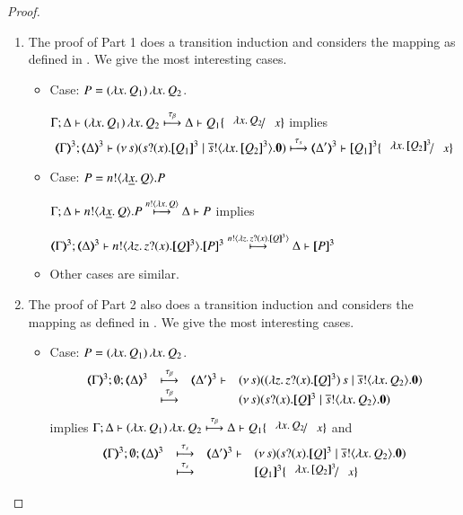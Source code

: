 \begin{proof}
\begin{enumerate}
	\item The proof of Part 1 does a transition induction and
	considers the mapping as defined in .
	We give the most interesting cases.

	\begin{itemize}
		\item	Case: $P = (\lambda x.\,Q_1)\, {\lambda x.\,Q_2}$.

			$\horel{\Gamma}{\Delta}{\appl{(\abs{x}{Q_1})}{\abs{x}{Q_2}}}{\hby{\btau}}{\Delta}{Q_1 \subst{\abs{x}{Q_2}}{x}}$ implies
\[
			\horel{\tmap{\Gamma}{3}}{\tmap{\Delta}{3}}{\newsp{s}{\binp{s}{x} \pmap{Q_1}{3} \Par \bout{\dual{s}}{\abs{x}{\pmap{Q_2}{3}}} \inact}}{\hby{\stau}}
			{\tmap{\Delta'}{3}}{\pmap{Q_1}{3} \subst{\abs{x}{\pmap{Q_2}{3}}}{x}}
\]

		\item	Case: $P = n ! \langle \lambda \underline{x}.\,Q \rangle . P$

			$\Gamma; \Delta \vdash n ! \langle \lambda \underline{x}.\,Q \rangle . P \stackrel{ n ! \langle \lambda x.\,Q \rangle}{\longmapsto} \Delta \vdash P$ implies

			$\horel{\tmap{\Gamma}{3}}{\tmap{\Delta}{3}}{\bout{n}{\abs{z} \binp{z}{x} \pmap{Q}{3}} \pmap{P}{3}}{\hby{ \bactout{n}{\abs{z}{\binp{z}{x} \pmap{Q}{3}} } }}{\Delta}{\pmap{P}{3}}$
		\item Other cases are similar. 
	\end{itemize}

	\item The proof of Part 2 also does a transition induction and
	considers the mapping as defined in .
	We give the most interesting cases.

	\begin{itemize}
		\item	Case: $P = (\lambda x.\,Q_1)\, {\lambda x.\,Q_2}$.
%
		\[
			\mhorel{\tmap{\Gamma}{3}}{\tmap{\Delta}{3}}{\newsp{s}{ \appl{(\abs{z}\binp{z}{x} \pmap{Q}{3})}{s}  \Par \bout{\dual{s}}{\abs{x}{Q_2}} \inact}}{\hby{\btau}}
			{\tmap{\Delta'}{3}}{}{\newsp{s}{\binp{s}{x} \pmap{Q}{3}  \Par \bout{\dual{s}}{\abs{x}{Q_2}} \inact}}
		\]
%
			\noi implies
			$\horel{\Gamma}{\Delta}{\appl{(\abs{x}{Q_1})}{\abs{x}{Q_2}}}{\hby{\btau}}{\Delta}{Q_1 \subst{\abs{x}{Q_2}}{x}}$ and
%
		\[
			\mhorel{\tmap{\Gamma}{3}}{\tmap{\Delta}{3}}{\newsp{s}{\binp{s}{x} \pmap{Q}{3}  \Par \bout{\dual{s}}{\abs{x}{Q_2}} \inact}}{\hby{\stau}}
			{\tmap{\Delta'}{3}}{}{\pmap{Q_1}{3} \subst{\abs{x}{\pmap{Q_2}{3}}}{x}}
		\]


\end{itemize}
\end{enumerate}
\end{proof}
